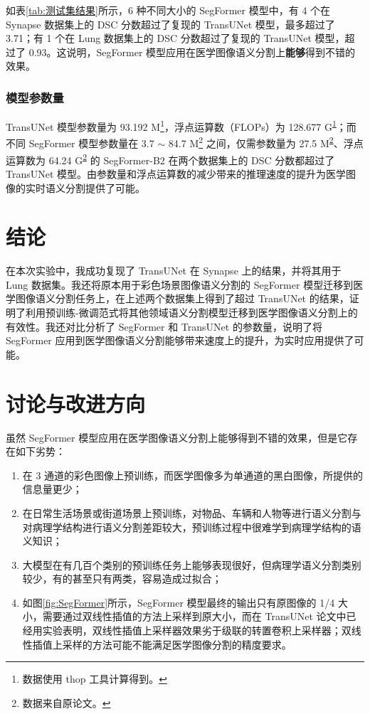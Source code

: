 \documentclass[hyperref,a4paper,UTF8]{ctexart}
\begin{document}
如表\ref{tab:测试集结果}所示，6 种不同大小的 SegFormer 模型中，有 4 个在 Synapse 数据集上的 DSC 分数超过了复现的 TransUNet 模型，最多超过了 3.71；有 1 个在 Lung 数据集上的 DSC 分数超过了复现的 TransUNet 模型，超过了 0.93。这说明，SegFormer 模型应用在医学图像语义分割上\textbf{能够}得到不错的效果。

\subsubsection{模型参数量}

TransUNet 模型参数量为 93.192 M\footnote{数据使用 thop 工具计算得到。\label{foot:thop}}，浮点运算数（FLOPs）为 128.677 G\textsuperscript{\ref{foot:thop}}；而不同 SegFormer 模型参数量在 3.7 $\sim$ 84.7 M\footnote{数据来自原论文\cite{SegFormer}。\label{foot:数据来自原论文}} 之间，仅需参数量为 27.5 M\textsuperscript{\ref{foot:数据来自原论文}}、浮点运算数为 64.24 G\textsuperscript{\ref{foot:数据来自原论文}} 的 SegFormer-B2 在两个数据集上的 DSC 分数都超过了 TransUNet 模型。由参数量和浮点运算数的减少带来的推理速度的提升为医学图像的实时语义分割提供了可能。

\section{结论\label{sec:结论}}

在本次实验中，我成功复现了 TransUNet 在 Synapse 上的结果，并将其用于 Lung 数据集。我还将原本用于彩色场景图像语义分割的 SegFormer 模型迁移到医学图像语义分割任务上，在上述两个数据集上得到了超过 TransUNet 的结果，证明了利用预训练-微调范式将其他领域语义分割模型迁移到医学图像语义分割上的有效性。我还对比分析了 SegFormer 和 TransUNet 的参数量，说明了将 SegFormer 应用到医学图像语义分割能够带来速度上的提升，为实时应用提供了可能。

\section{讨论与改进方向\label{sec:讨论与改进方向}}

虽然 SegFormer 模型应用在医学图像语义分割上能够得到不错的效果，但是它存在如下劣势：

\begin{enumerate}[itemsep=2pt,topsep=0pt,parsep=0pt]
    \item 在 3 通道的彩色图像上预训练，而医学图像多为单通道的黑白图像，所提供的信息量更少；
    \item 在日常生活场景或街道场景上预训练，对物品、车辆和人物等进行语义分割与对病理学结构进行语义分割差距较大，预训练过程中很难学到病理学结构的语义知识；
    \item 大模型在有几百个类别的预训练任务上能够表现很好，但病理学语义分割类别较少，有的甚至只有两类，容易造成过拟合；
    \item 如图\ref{fig:SegFormer}所示，SegFormer 模型最终的输出只有原图像的 1/4 大小，需要通过双线性插值的方法上采样到原大小，而在 TransUNet 论文\cite{TransUNet}中已经用实验表明，双线性插值上采样器效果劣于级联的转置卷积上采样器；双线性插值上采样的方法可能不能满足医学图像分割的精度要求。
\end{enumerate}
\end{document}
